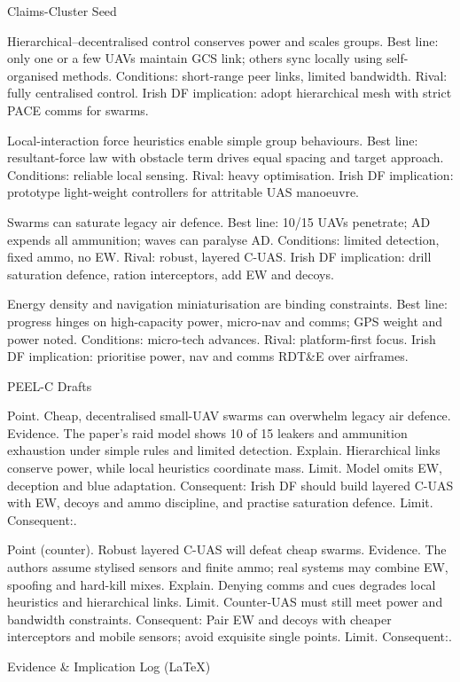 Claims-Cluster Seed

Hierarchical–decentralised control conserves power and scales groups.
Best line: only one or a few UAVs maintain GCS link; others sync locally using self-organised methods. Conditions: short-range peer links, limited bandwidth. Rival: fully centralised control. Irish DF implication: adopt hierarchical mesh with strict PACE comms for swarms.

Local-interaction force heuristics enable simple group behaviours.
Best line: resultant-force law with obstacle term drives equal spacing and target approach. Conditions: reliable local sensing. Rival: heavy optimisation. Irish DF implication: prototype light-weight controllers for attritable UAS manoeuvre.

Swarms can saturate legacy air defence.
Best line: 10/15 UAVs penetrate; AD expends all ammunition; waves can paralyse AD. Conditions: limited detection, fixed ammo, no EW. Rival: robust, layered C-UAS. Irish DF implication: drill saturation defence, ration interceptors, add EW and decoys.

Energy density and navigation miniaturisation are binding constraints.
Best line: progress hinges on high-capacity power, micro-nav and comms; GPS weight and power noted. Conditions: micro-tech advances. Rival: platform-first focus. Irish DF implication: prioritise power, nav and comms RDT&E over airframes.

PEEL-C Drafts

Point. Cheap, decentralised small-UAV swarms can overwhelm legacy air defence.
Evidence. The paper’s raid model shows 10 of 15 leakers and ammunition exhaustion under simple rules and limited detection.
Explain. Hierarchical links conserve power, while local heuristics coordinate mass.
Limit. Model omits EW, deception and blue adaptation. Consequent: Irish DF should build layered C-UAS with EW, decoys and ammo discipline, and practise saturation defence. Limit. Consequent:.

Point (counter). Robust layered C-UAS will defeat cheap swarms.
Evidence. The authors assume stylised sensors and finite ammo; real systems may combine EW, spoofing and hard-kill mixes.
Explain. Denying comms and cues degrades local heuristics and hierarchical links.
Limit. Counter-UAS must still meet power and bandwidth constraints. Consequent: Pair EW and decoys with cheaper interceptors and mobile sensors; avoid exquisite single points. Limit. Consequent:.

Evidence & Implication Log (LaTeX)

